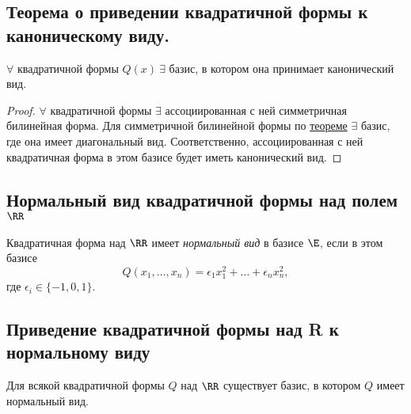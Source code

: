 \subsection{Теорема о приведении квадратичной формы к каноническому виду.}

\begin{theorem}
    $\forall $ квадратичной формы $Q(x) \ \exists$ базис, в котором она принимает канонический вид.
\end{theorem}

\begin{proof}
    $\forall$ квадратичной формы $\exists$ ассоциированная с ней симметричная билинейная форма. Для симметричной билинейной формы по \hyperref[lec19:symmetric_bilinear_form_diagonalization]{теореме} $\exists$ базис, где она имеет диагональный вид. Соответственно, ассоциированная с ней квадратичная форма в этом базисе будет иметь канонический вид.
\end{proof}


\subsection{Нормальный вид квадратичной формы над полем $\RR$}

\begin{definition}
    Квадратичная форма над $\RR$ имеет \textit{нормальный вид} в базисе $\E$, если в этом базисе
    \begin{equation*}
        Q(x_1, \dots, x_n) = \epsilon_1 x_1^2 + \dots + \epsilon_n x_n^2
    ,\end{equation*}
    где $\epsilon_i \in \{-1, 0, 1\}$.
\end{definition}


\subsection{Приведение квадратичной формы над R к нормальному виду}

\begin{corollary}
    Для всякой квадратичной формы $Q$ над $\RR$ существует базис, в котором $Q$ имеет нормальный вид.
\end{corollary}

